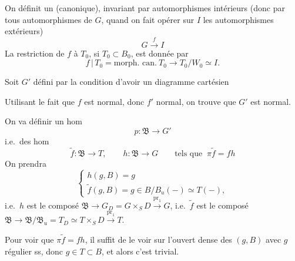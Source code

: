\documentclass[11pt,a4paper]{article}
\begin{document}
On définit un   (canonique), invariant par
automorphismes intérieurs (donc par tous automorphismes de $G$, quand on fait
opérer sur $I$ les automorphismes extérieurs)
\[
  G\xrightarrow{\ f\ } I
\]
La restriction de $f$ à $T_0$, si $T_0\subset B_0$, est donnée par
\[
  f\,|\,T_0 = \text{morph.\ can.}\ T_0\to T_0/W_0\simeq I .
\]

Soit $G'$ défini par la condition d'avoir un diagramme cartésien



Utilisant le fait que $f$ est normal, donc $f'$ normal, on trouve que $G'$
est normal.

On va définir un hom
\[
  p\colon \mathfrak{B}\longrightarrow G'
\]
i.e.\ des hom
\[
  \tilde f\colon\mathfrak{B}\to T,\qquad h\colon\mathfrak{B}\to G
  \qquad\text{tels que }\ \pi\tilde f=f h
\]
On prendra
\[
  \begin{cases}
  h(g,B)=g\\
  \tilde f(g,B)=g\in B/B_u(-)\simeq T(-),
  \end{cases}
\]
i.e.\ $h$ est le composé
$\mathfrak{B}\to G_D=G\times_S D\xrightarrow{\mathrm{pr}_1}G$, i.e.\ $\tilde f$
est le composé
$\mathfrak{B}\to\mathfrak{B}/\mathfrak{B}_u=T_D\simeq T\times_S
D\xrightarrow{\mathrm{pr}_1}T$.

Pour voir que $\pi\tilde f=fh$, il suffit de le voir sur l'ouvert dense
 des  $(g,B)$ avec $g$ régulier
ss, \struck{\ill{}} donc $g\in T\subset B$, et alors c'est trivial.
\end{document}
